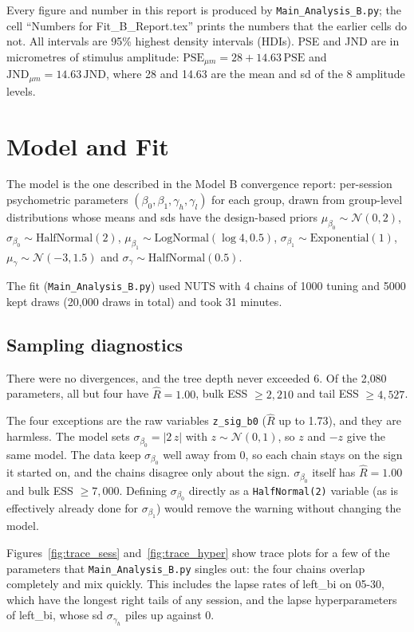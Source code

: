 \documentclass[11pt]{article}
\newcommand{\code}[1]{\texttt{#1}}
\begin{document}
Every figure and number in this report is produced by
\code{Main\_Analysis\_B.py}; the cell ``Numbers for Fit\_B\_Report.tex'' prints
the numbers that the earlier cells do not. All intervals are 95\% highest
density intervals (HDIs). PSE and JND are in
micrometres of stimulus amplitude: $\text{PSE}_{\mu m} = 28 + 14.63\,\text{PSE}$
and $\text{JND}_{\mu m} = 14.63\,\text{JND}$, where 28 and 14.63 are the mean
and sd of the 8 amplitude levels.

\section{Model and Fit}

The model is the one described in the Model B convergence report: per-session
psychometric parameters $(\beta_0, \beta_1, \gamma_h, \gamma_l)$ for each
group, drawn from group-level distributions whose means and sds have the
design-based priors
$\mu_{\beta_0} \sim \mathcal{N}(0, 2)$,
$\sigma_{\beta_0} \sim \text{HalfNormal}(2)$,
$\mu_{\beta_1} \sim \text{LogNormal}(\log 4, 0.5)$,
$\sigma_{\beta_1} \sim \text{Exponential}(1)$,
$\mu_\gamma \sim \mathcal{N}(-3, 1.5)$ and
$\sigma_\gamma \sim \text{HalfNormal}(0.5)$.

The fit (\code{Main\_Analysis\_B.py}) used NUTS with 4 chains of 1000 tuning and
5000 kept draws (20{,}000 draws in total) and took 31 minutes.

\subsection{Sampling diagnostics}

There were no divergences, and the tree depth never exceeded 6. Of the 2{,}080
parameters, all but four have $\hat{R} = 1.00$, bulk ESS $\ge 2{,}210$ and
tail ESS $\ge 4{,}527$.

The four exceptions are the raw variables \code{z\_sig\_b0} ($\hat{R}$ up to
1.73), and they are harmless. The model sets
$\sigma_{\beta_0} = |2\,z|$ with $z \sim \mathcal{N}(0,1)$, so $z$ and $-z$ give
the same model. The data keep $\sigma_{\beta_0}$ well away from 0, so each chain
stays on the sign it started on, and the chains disagree only about the sign.
$\sigma_{\beta_0}$ itself has $\hat{R} = 1.00$ and bulk ESS $\ge 7{,}000$. Defining $\sigma_{\beta_0}$ directly as a
\code{HalfNormal(2)} variable (as is effectively already done for
$\sigma_{\beta_1}$) would remove the warning without changing the model.

Figures~\ref{fig:trace_sess} and~\ref{fig:trace_hyper} show trace plots for a
few of the parameters that \code{Main\_Analysis\_B.py} singles out: the four
chains overlap completely and mix quickly. This includes the lapse rates of
left\_bi on 05-30, which have the longest right tails of any session, and the
lapse hyperparameters of left\_bi, whose sd $\sigma_{\gamma_h}$ piles up
against 0.
\end{document}
